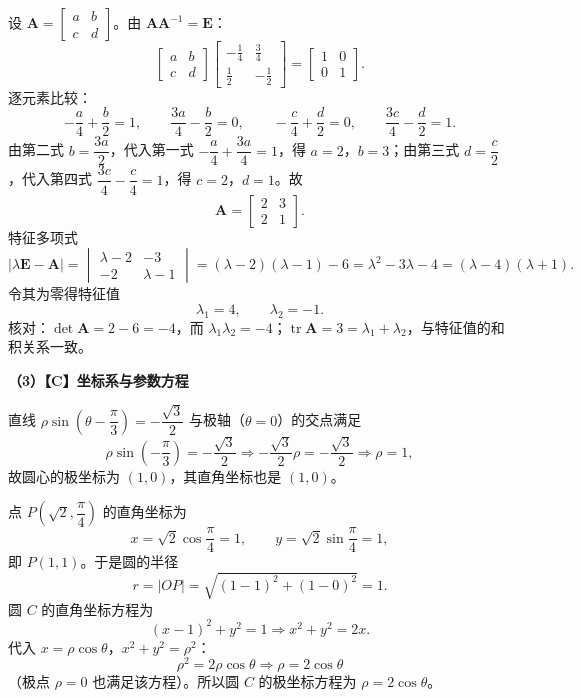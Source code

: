 \begin{answer}
设 $\boldsymbol A=\begin{bmatrix}a&b\\c&d\end{bmatrix}$。由 $\boldsymbol A\boldsymbol A^{-1}=\boldsymbol E$：
\nopagebreak[4]
\[\begin{bmatrix}a&b\\c&d\end{bmatrix}\begin{bmatrix}-\frac14&\frac34\\[2pt]\frac12&-\frac12\end{bmatrix}=\begin{bmatrix}1&0\\0&1\end{bmatrix}.\]
逐元素比较：
\nopagebreak[4]
\[-\frac a4+\frac b2=1,\qquad\frac{3a}4-\frac b2=0,\qquad-\frac c4+\frac d2=0,\qquad\frac{3c}4-\frac d2=1.\]
由第二式 $b=\dfrac{3a}{2}$，代入第一式 $-\dfrac a4+\dfrac{3a}4=1$，得 $a=2$，$b=3$；由第三式 $d=\dfrac c2$，代入第四式 $\dfrac{3c}4-\dfrac c4=1$，得 $c=2$，$d=1$。故
\nopagebreak[4]
\[\boldsymbol A=\begin{bmatrix}2&3\\2&1\end{bmatrix}.\]
特征多项式
\nopagebreak[4]
\[\left|\lambda\boldsymbol E-\boldsymbol A\right|=\begin{vmatrix}\lambda-2&-3\\-2&\lambda-1\end{vmatrix}=(\lambda-2)(\lambda-1)-6=\lambda^2-3\lambda-4=(\lambda-4)(\lambda+1).\]
令其为零得特征值
\nopagebreak[4]
\[\lambda_1=4,\qquad\lambda_2=-1.\]
核对：$\det\boldsymbol A=2-6=-4$，而 $\lambda_1\lambda_2=-4$；$\operatorname{tr}\boldsymbol A=3=\lambda_1+\lambda_2$，与特征值的和积关系一致。

\textbf{（3）【C】坐标系与参数方程}

直线 $\rho\sin\left(\theta-\dfrac\pi3\right)=-\dfrac{\sqrt3}{2}$ 与极轴（$\theta=0$）的交点满足
\nopagebreak[4]
\[\rho\sin\left(-\frac\pi3\right)=-\frac{\sqrt3}{2}\Longrightarrow-\frac{\sqrt3}{2}\rho=-\frac{\sqrt3}{2}\Longrightarrow\rho=1,\]
故圆心的极坐标为 $(1,0)$，其直角坐标也是 $(1,0)$。

点 $P\left(\sqrt2,\dfrac\pi4\right)$ 的直角坐标为
\nopagebreak[4]
\[x=\sqrt2\cos\frac\pi4=1,\qquad y=\sqrt2\sin\frac\pi4=1,\]
即 $P(1,1)$。于是圆的半径
\nopagebreak[4]
\[r=|OP|=\sqrt{(1-1)^2+(1-0)^2}=1.\]
圆 $C$ 的直角坐标方程为
\nopagebreak[4]
\[(x-1)^2+y^2=1\Longrightarrow x^2+y^2=2x.\]
代入 $x=\rho\cos\theta$，$x^2+y^2=\rho^2$：
\nopagebreak[4]
\[\rho^2=2\rho\cos\theta\Longrightarrow\rho=2\cos\theta\]
（极点 $\rho=0$ 也满足该方程）。所以圆 $C$ 的极坐标方程为 $\rho=2\cos\theta$。


\end{answer}
